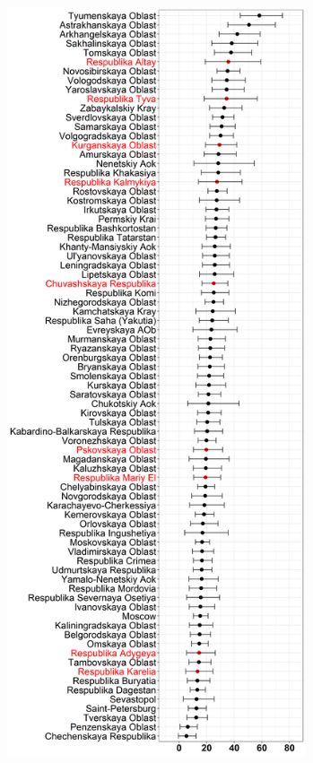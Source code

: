 \documentclass[alpha-refs]{wiley-article-03v}
\begin{document}
\begin{figure}[htp]
	\begin{minipage}[b]{.5\linewidth}
		\centering
		\hspace*{-0.4in}
		\includegraphics[width=250pt]{reg_he_18.png}
		\label{}
	\end{minipage}
	\hfill
	\begin{minipage}[b]{.5\linewidth}
		\centering
		\hspace*{-0.2in}

\end{minipage}
\end{figure}
\end{document}
